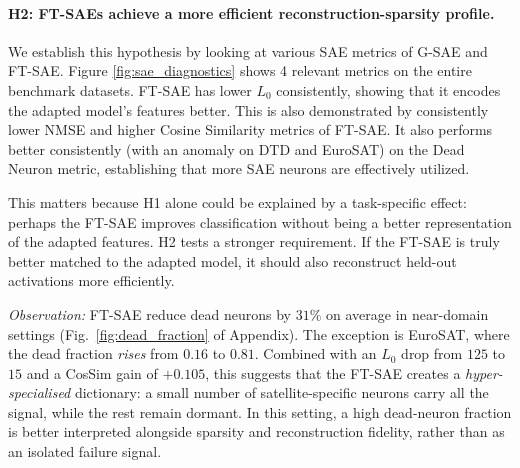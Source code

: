 

%

\vspace{-5pt}
\paragraph{H2: FT-SAEs achieve a more efficient reconstruction-sparsity profile.}
\label{sec:exp:h2}

We establish this hypothesis by looking at various SAE metrics of G-SAE and FT-SAE. Figure \ref{fig:sae_diagnostics} shows 4 relevant metrics on the entire benchmark datasets. FT-SAE has lower $L_0$ consistently, showing that it encodes the adapted model's features better. This is also demonstrated by consistently lower NMSE and higher Cosine Similarity metrics of FT-SAE. It also performs better consistently (with an anomaly on DTD and EuroSAT) on the Dead Neuron metric, establishing that more SAE neurons are effectively utilized. 

% 

This matters because H1 alone could be explained by a task-specific effect: perhaps the
FT-SAE improves classification without being a better representation of the adapted
features. H2 tests a stronger requirement. If the FT-SAE is truly better matched to
the adapted model, it should also reconstruct held-out activations more efficiently.

{\em Observation:} FT-SAE reduce dead neurons by $31\%$ on average in near-domain settings
(Fig.~\ref{fig:dead_fraction} of Appendix).
The exception is EuroSAT, where the dead fraction \emph{rises} from $0.16$ to $0.81$.
Combined with an $L_0$ drop from $125$ to $15$ and a CosSim gain of $+0.105$,
this suggests that the FT-SAE creates a \emph{hyper-specialised} dictionary:
a small number of satellite-specific neurons carry all the signal,
while the rest remain dormant.
In this setting, a high dead-neuron fraction is better interpreted alongside sparsity and
reconstruction fidelity, rather than as an isolated failure signal. \vspace{-1mm}

